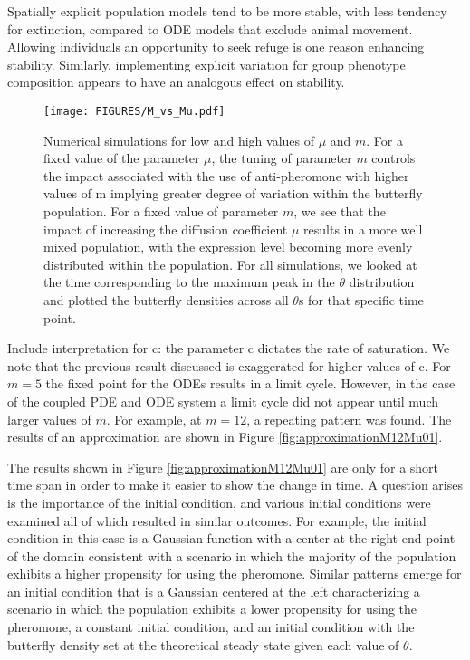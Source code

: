\documentclass[review,authoryear]{elsarticle}
\begin{document}
Spatially explicit population models tend to be more stable, with less tendency for extinction, compared to ODE models that exclude animal movement. Allowing individuals an opportunity to seek refuge is one reason enhancing stability. Similarly, implementing explicit variation for group phenotype composition appears to have an analogous effect on stability. 

\begin{figure}[htb]
  \centering
  \texttt{[image: FIGURES/M\_vs\_Mu.pdf]}
  \caption[$\mu$ vs m comparison]{Numerical simulations for low and high values of $\mu$ and $m$. For a fixed value of the parameter $\mu$, the tuning of parameter $m$ controls the impact associated with the use of anti-pheromone with higher values of m implying greater degree of variation within the butterfly population. For a fixed value of parameter $m$, we see that the impact of increasing the diffusion coefficient $\mu$ results in a more well mixed population, with the expression level becoming more evenly distributed within the population. For all simulations, we looked at the time corresponding to the maximum peak in the $\theta$ distribution and plotted the butterfly densities across all $\theta$s for that specific time point.}
  \label{fig:mu_vs_m}
\end{figure}
 Include interpretation for c: the parameter c dictates the rate of saturation.  We note that the previous result discussed is exaggerated for higher values of c.     For $m=5$ the fixed point for the ODEs results in a
limit cycle. However, in the case of the coupled PDE and ODE system a
limit cycle did not appear until much larger values of $m$. For
example, at $m=12$, a repeating pattern was found. The results of an
approximation are shown in Figure \ref{fig:approximationM12Mu01}.

The results shown in Figure \ref{fig:approximationM12Mu01} are only
for a short time span in order to make it easier to show the change in
time. A question arises is the importance of the initial condition, and various initial conditions were examined all of which resulted in similar outcomes. For example, the initial condition in this case is a Gaussian function with a center
at the right end point of the domain consistent with a scenario in which the majority of the population exhibits a higher propensity for using the pheromone.  Similar patterns emerge for an initial
condition that is a Gaussian centered at the left characterizing a scenario in which the population exhibits a lower propensity for using the pheromone, a constant initial
condition, and an initial condition with the butterfly density set at
the theoretical steady state given each value of $\theta$.
\end{document}
